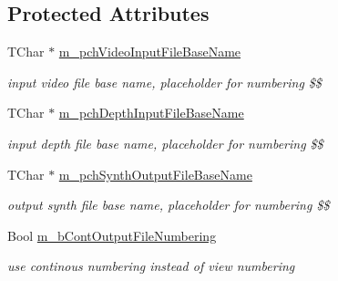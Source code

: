 \subsection*{Protected Attributes}
\begin{DoxyCompactItemize}
\item 
\mbox{\label{class_t_app_renderer_cfg_a38464bb37eef1cc89a70716ee7bf568a}} 
T\+Char $\ast$ \hyperlink{class_t_app_renderer_cfg_a38464bb37eef1cc89a70716ee7bf568a}{m\+\_\+pch\+Video\+Input\+File\+Base\+Name}
\begin{DoxyCompactList}\small\item\em input video file base name, placeholder for numbering \$\$ \end{DoxyCompactList}\item 
\mbox{\label{class_t_app_renderer_cfg_a4257d644b68ddf77761283f836d52e58}} 
T\+Char $\ast$ \hyperlink{class_t_app_renderer_cfg_a4257d644b68ddf77761283f836d52e58}{m\+\_\+pch\+Depth\+Input\+File\+Base\+Name}
\begin{DoxyCompactList}\small\item\em input depth file base name, placeholder for numbering \$\$ \end{DoxyCompactList}\item 
\mbox{\label{class_t_app_renderer_cfg_a545dc45a80d6c7561d39f42c3f8c1732}} 
T\+Char $\ast$ \hyperlink{class_t_app_renderer_cfg_a545dc45a80d6c7561d39f42c3f8c1732}{m\+\_\+pch\+Synth\+Output\+File\+Base\+Name}
\begin{DoxyCompactList}\small\item\em output synth file base name, placeholder for numbering \$\$ \end{DoxyCompactList}\item 
\mbox{\label{class_t_app_renderer_cfg_a382c2d0bc812c9bb8bc06d6b981798d0}} 
Bool \hyperlink{class_t_app_renderer_cfg_a382c2d0bc812c9bb8bc06d6b981798d0}{m\+\_\+b\+Cont\+Output\+File\+Numbering}
\begin{DoxyCompactList}\small\item\em use continous numbering instead of view numbering \end{DoxyCompactList}\item 
\mbox{\label{class_t_app_renderer_cfg_a83a77a0cbaa0e80f11cdbba4c9949ea3}} 

\end{DoxyCompactItemize}
